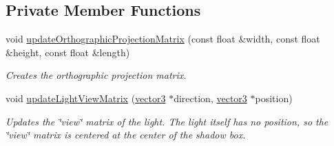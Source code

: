 \subsection*{Private Member Functions}
\begin{DoxyCompactItemize}
\item 
void \hyperlink{classflounder_1_1shadows_a84e70f2f82aaf5aee9be500e3f47f498}{update\+Orthographic\+Projection\+Matrix} (const float \&width, const float \&height, const float \&length)
\begin{DoxyCompactList}\small\item\em Creates the orthographic projection matrix. \end{DoxyCompactList}\item 
void \hyperlink{classflounder_1_1shadows_a4a85e8332ff2d7fc18522262f7dc8f89}{update\+Light\+View\+Matrix} (\hyperlink{classflounder_1_1vector3}{vector3} $\ast$direction, \hyperlink{classflounder_1_1vector3}{vector3} $\ast$position)
\begin{DoxyCompactList}\small\item\em Updates the \char`\"{}view\char`\"{} matrix of the light. The light itself has no position, so the \char`\"{}view\char`\"{} matrix is centered at the center of the shadow box. \end{DoxyCompactList}\end{DoxyCompactItemize}
